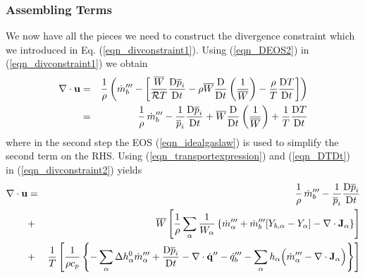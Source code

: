 \documentclass[11pt]{book}
\begin{document}
\subsubsection{Assembling Terms}
\label{putting_it_all_together}

We now have all the pieces we need to construct the divergence constraint which we introduced in Eq. (\ref{eqn_divconstraint1}).  Using (\ref{eqn_DEOS2}) in (\ref{eqn_divconstraint1}) we obtain
\begin{eqnarray}
\label{eqn_divconstraint2}
\Div\mathbf{u} &=& \frac{1}{\rho} \left( \dot{m}_b^{\tripleprime} -  \left[ \frac{\overline{W}}{\mathcal{R}T} \frac{\mbox{D}\overline{p}_i}{\mbox{D} t} -
\rho \overline{W} \frac{\mbox{D}}{\mbox{D} t}\left(\frac{1}{\overline{W}}\right) - \frac{\rho}{T} \frac{\mbox{D} T}{\mbox{D} t} \right] \right)  \nonumber \vspace{0.3cm} \\
&=& \frac{1}{\rho} \,\dot{m}_b^{\tripleprime} -  \frac{1}{\overline{p}_i} \frac{\mbox{D}\overline{p}_i}{\mbox{D} t} + \overline{W} \frac{\mbox{D}}{\mbox{D} t}\left(\frac{1}{\overline{W}}\right) +
\frac{1}{T} \frac{\mbox{D} T}{\mbox{D} t}
\end{eqnarray}
where in the second step the EOS (\ref{eqn_idealgaslaw}) is used to simplify the second term on the RHS.
Using (\ref{eqn_transportexpression}) and (\ref{eqn_DTDt}) in (\ref{eqn_divconstraint2}) yields
\begin{eqnarray}
\label{eqn_divconstraint3}
\Div\mathbf{u} &=& \frac{1}{\rho} \,\dot{m}_b^{\tripleprime} -  \frac{1}{\overline{p}_i} \frac{\mbox{D}\overline{p}_i}{\mbox{D} t} \nonumber \vspace{0.3cm}\\
&+& \overline{W} \left[\frac{1}{\rho} \sum_\alpha \frac{1}{W_\alpha} \left\{  \dot{m}_\alpha^{\tripleprime}
+ \dot{m}_{b}^{\tripleprime}[Y_{b,\alpha} - Y_\alpha] - \Div \mathbf{J}_{\alpha} \right\} \right] \nonumber \vspace{0.3cm}\\
&+&  \frac{1}{T} \left[ \frac{1}{\rho c_p} \left\{-\sum_\alpha \Delta h^0_\alpha \dot{m}_{\alpha}^{\tripleprime} +
\frac{\mbox{D} \overline{p}_i }{\mbox{D} t} - \Div\dot{\mathbf{q}}^{\prime\prime} -\dq_b''' - \sum_\alpha h_{\alpha} \Big(  \dot{m}_\alpha^{\tripleprime} - \Div \mathbf{J}_{\alpha} \Big) \right\} \right]
\end{eqnarray}
\end{document}
